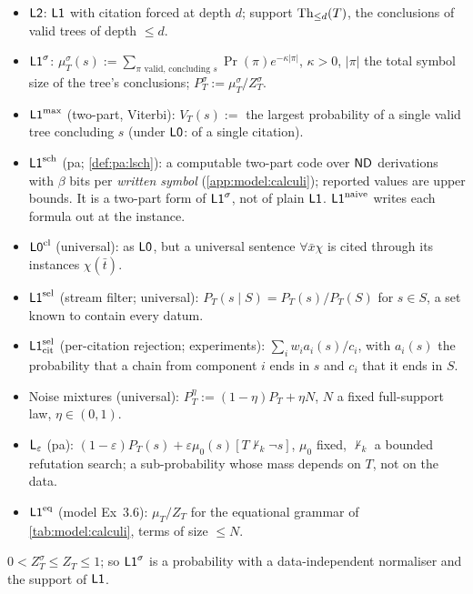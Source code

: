 \begin{definition}[Variants]\label{def:model:variants}
\begin{itemize}[leftmargin=*,itemsep=1pt]
\item $\mathord{\mathsf{L2}}$: $\mathord{\mathsf{L1}}$ with citation forced at depth $d$; support $\mathrm{Th}_{\le d}(T)$, the conclusions of valid trees of depth $\le d$.
\item $\mathord{\mathsf{L1}}^{\sigma}$: $\mu^\sigma_T(s):=\sum_{\pi\text{ valid, concluding }s}\Pr(\pi)e^{-\kappa|\pi|}$, $\kappa>0$, $|\pi|$ the total symbol size of the tree's conclusions; $P^\sigma_T:=\mu^\sigma_T/Z^\sigma_T$.
\item $\mathord{\mathsf{L1}}^{\max}$ (two-part, Viterbi): $V_T(s):=$ the largest probability of a single valid tree concluding $s$ (under $\mathord{\mathsf{L0}}$: of a single citation).
\item $\mathord{\mathsf{L1}}^{\mathrm{sch}}$ (pa; \cref{def:pa:lsch}): a computable two-part code over $\mathsf{ND}$ derivations with $\beta$ bits per \emph{written symbol} (\cref{app:model:calculi}); reported values are upper bounds. It is a two-part form of $\mathord{\mathsf{L1}}^{\sigma}$, not of plain $\mathord{\mathsf{L1}}$. $\mathord{\mathsf{L1}}^{\mathrm{naive}}$ writes each formula out at the instance.
\item $\mathord{\mathsf{L0}}^{\mathrm{cl}}$ (universal): as $\mathord{\mathsf{L0}}$, but a universal sentence $\forall\bar x\chi$ is cited through its instances $\chi(\bar t)$.
\item $\mathord{\mathsf{L1}}^{\mathrm{sel}}$ (stream filter; universal): $P_T(s\mid S)=P_T(s)/P_T(S)$ for $s\in S$, a set known to contain every datum.
\item $\mathord{\mathsf{L1}}^{\mathrm{sel}}_{\mathrm{cit}}$ (per-citation rejection; experiments): $\sum_iw_ia_i(s)/c_i$, with $a_i(s)$ the probability that a chain from component $i$ ends in $s$ and $c_i$ that it ends in $S$.
\item Noise mixtures (universal): $P^\eta_T:=(1-\eta)P_T+\eta N$, $N$ a fixed full-support law, $\eta\in(0,1)$.
\item $\mathsf{L}_{\varepsilon}$ (pa): $(1-\varepsilon)P_T(s)+\varepsilon\mu_0(s)[T\nvdash_k\neg s]$, $\mu_0$ fixed, $\nvdash_k$ a bounded refutation search; a sub-probability whose mass depends on $T$, not on the data.
\item $\mathord{\mathsf{L1}}^{\mathrm{eq}}$ (model Ex~3.6): $\mu_T/Z_T$ for the equational grammar of \cref{tab:model:calculi}, terms of size $\le N$.
\end{itemize}
\end{definition}

\begin{lemma}\label{lem:model:lsig}
$0<Z^\sigma_T\le Z_T\le1$; so $\mathord{\mathsf{L1}}^{\sigma}$ is a probability with a data-independent normaliser and the support of $\mathord{\mathsf{L1}}$.
\end{lemma}

